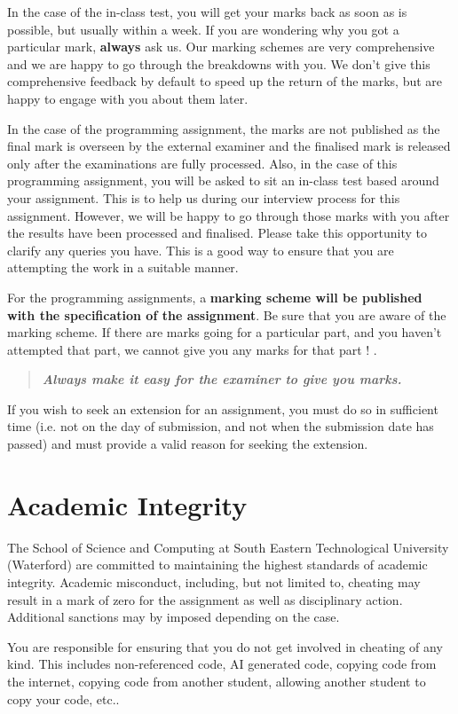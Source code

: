 \documentclass{article}
\begin{document}
In the case of the in-class test, you will get your marks back as soon as is possible, but usually within a week. 
If you are wondering why you got a particular mark, \textbf{always} ask us. Our marking schemes are very comprehensive and 
we are happy to go through the breakdowns with you. 
We don't give this comprehensive feedback by default to speed up the return of the marks, but are happy to engage with you  about them later. 

In the case of the programming  assignment, the marks are not published as the final mark is overseen by the external examiner and the 
finalised mark is released only after the examinations are fully processed. Also, in the case of this programming assignment, you will be asked 
to sit an in-class test based around your assignment. This is to help us during our interview process for this assignment. 
However, we will be happy to go through those marks with you 
after the results have been processed and finalised. 
Please take this opportunity to clarify any queries you have. This is a good way to ensure that 
you are attempting the work in a suitable manner.


For the programming assignments, a \textbf{marking scheme will be published with the specification of the assignment}. Be sure that you are aware of the marking scheme. 
If there are marks going for a particular part, and you haven't attempted that part, we cannot give you any marks for that part ! . 
\begin{quote}
 \textbf{\textit{Always make it easy for the examiner to give you marks.}}
\end{quote}

If you wish to seek an extension for an assignment, you must do so in sufficient time (i.e. not on the day of submission, and not 
when the submission date has passed) and must provide a valid reason for seeking the extension. 


\section{Academic Integrity}
The School of Science and Computing  at South Eastern Technological University (Waterford) are  committed to maintaining the highest standards of academic integrity. 
Academic misconduct, including, but not limited to, 
cheating may result in a mark of zero for the assignment as well as disciplinary action.
 Additional sanctions may by imposed depending on the case. 


 You are responsible for ensuring that you do not get involved in cheating of any kind. This includes non-referenced code, 
 AI generated code, copying code from the internet, copying code from another student,
    allowing another student to copy your code, etc..
 
\end{document}
